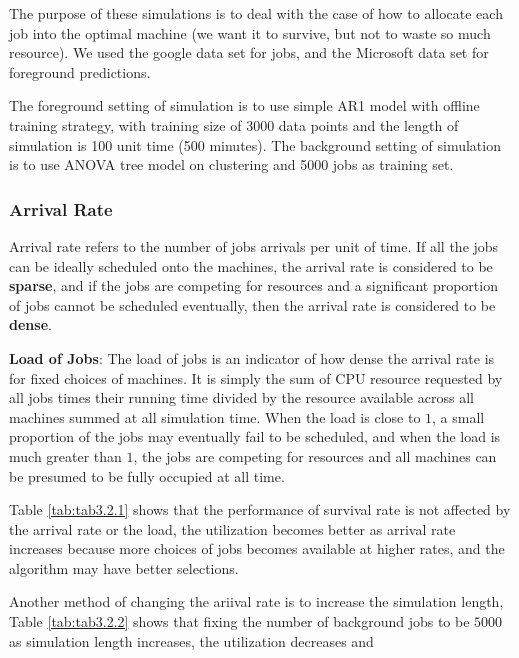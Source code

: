 \documentclass{article}
\begin{document}
\begin{flushleft}
The purpose of these simulations is to deal with the case of how to allocate each job into the optimal machine (we want it to survive, but not to waste so much resource). We used the google data set for jobs, and the Microsoft data set for foreground predictions.
\end{flushleft}

\begin{flushleft}
The foreground setting of simulation is to use simple AR1 model with offline training strategy, with training size of 3000 data points and the length of simulation is 100 unit time (500 minutes). The background setting of simulation is to use ANOVA tree model on clustering and 5000 jobs as training set.
\end{flushleft}

\subsubsection{Arrival Rate}

\begin{flushleft}
Arrival rate refers to the number of jobs arrivals per unit of time. If all the jobs can be ideally scheduled onto the machines, the arrival rate is considered to be \textbf{sparse}, and if the jobs are competing for resources and a significant proportion of jobs cannot be scheduled eventually, then the arrival rate is considered to be \textbf{dense}.

\textbf{Load of Jobs}: The load of jobs is an indicator of how dense the arrival rate is for fixed choices of machines. It is simply the sum of CPU resource requested by all jobs times their running time divided by the resource available across all machines summed at all simulation time. When the load is close to $1$, a small proportion of the jobs may eventually fail to be scheduled, and when the load is much greater than $1$, the jobs are competing for resources and all machines can be presumed to be fully occupied at all time.

Table \ref{tab:tab3.2.1} shows that the performance of survival rate is not affected by the arrival rate or the load, the utilization becomes better as arrival rate increases because more choices of jobs becomes available at higher rates, and the algorithm may have better selections.

Another method of changing the ariival rate is to increase the simulation length, Table \ref{tab:tab3.2.2} shows that fixing the number of background jobs to be $5000$ as simulation length increases, the utilization decreases and 
\end{flushleft}
\end{document}
